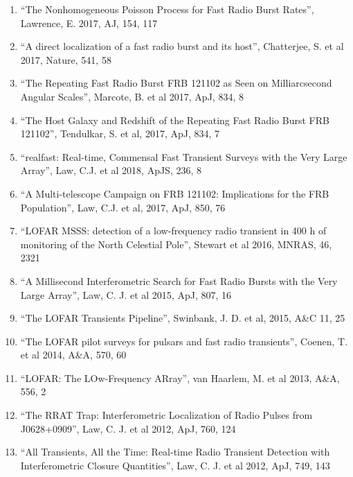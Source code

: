 \documentclass[11pt]{article}
\begin{document}
\begin{enumerate}
    \item ``The Nonhomogeneous Poisson Process for Fast Radio Burst Rates'', Lawrence, E. 2017, AJ, 154, 117
    
    \item ``A direct localization of a fast radio burst and its host'', Chatterjee, S. et al 2017, Nature, 541, 58
    
    \item ``The Repeating Fast Radio Burst FRB 121102 as Seen on Milliarcsecond Angular Scales'', Marcote, B. et al 2017, ApJ, 834, 8

    \item ``The Host Galaxy and Redshift of the Repeating Fast Radio Burst FRB 121102'', Tendulkar, S. et al, 2017, ApJ, 834, 7

    \item ``realfast: Real-time, Commensal Fast Transient Surveys with the Very Large Array'', Law, C.J. et al 2018, ApJS, 236, 8

    \item ``A Multi-telescope Campaign on FRB 121102: Implications for the FRB Population'', Law, C.J. et al, 2017, ApJ, 850, 76

    \item ``LOFAR MSSS: detection of a low-frequency radio transient in 400 h of monitoring of the North Celestial Pole'', Stewart et al 2016, MNRAS, 46, 2321

    \item ``A Millisecond Interferometric Search for Fast Radio Bursts with the Very Large Array'', Law, C. J. et al 2015, ApJ, 807, 16

    \item ``The LOFAR Transients Pipeline'', Swinbank, J. D. et al, 2015, A\&C 11, 25

    \item ``The LOFAR pilot surveys for pulsars and fast radio transients'', Coenen, T. et al 2014, A\&A, 570, 60

    \item ``LOFAR: The LOw-Frequency ARray'', van Haarlem, M. et al 2013, A\&A, 556, 2

    \item ``The RRAT Trap: Interferometric Localization of Radio Pulses from J0628+0909'', Law, C. J. et al 2012, ApJ, 760, 124

    \item ``All Transients, All the Time: Real-time Radio Transient Detection with Interferometric Closure Quantities'',  Law, C. J. et al 2012, ApJ, 749, 143


\end{enumerate}
\end{document}
